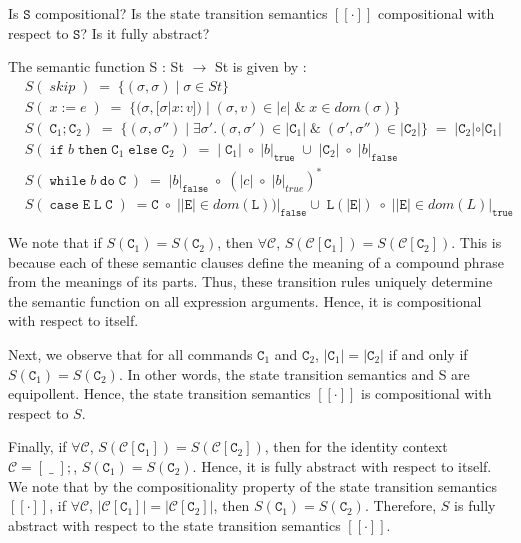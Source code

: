 \documentclass{article}
\newcommand{\E}{\mathtt{E}}
\newcommand{\C}{\mathtt{C}}
\newcommand{\LL}{\mathtt{L}}
\newcommand{\true}{\mathtt{true}}
\newcommand{\false}{\mathtt{false}}
\newcommand{\ifsym}{\mathtt{if}}
\newcommand{\then}{\mathtt{then}}
\newcommand{\elsesym}{\mathtt{else}}
\newcommand{\whilesym}{\mathtt{while}}
\newcommand{\dosym}{\mathtt{do}}
\newcommand{\case}{\mathtt{case}}
\newcommand{\Sem}{\mathtt{S}}
\begin{document}
\begin{enumerate}
{Is $\Sem$ compositional? 
Is the state transition semantics $[[\cdot]]$ compositional with respect to $\Sem$? 
Is it fully abstract?
}

The semantic function S : St $\rightarrow$ St is given by :
\begin{align*}
& S( \; skip \; ) \; = \; \{ (\sigma, \sigma) \; | \; \sigma \in St \} \\
& S( \; x := e \; ) \; = \; \{ (\sigma, [\sigma | x : v]) \; | \; (\sigma, v)
\in | e | \; \& \; x \in dom(\sigma) \} \\
& S( \; \C_1 ; \C_2 ) \;  = \; \{ (\sigma, \sigma'') \; | \; \exists
\sigma'.(\sigma, \sigma') \in | \C_1 | \; \&  \; (\sigma',\sigma'') \in | \C_2 | \} 
\; = \; | \C_2 | \circ | \C_1 | \\
& S( \; \ifsym \; b \; \then  \; \C_1 \; \elsesym \; \C_2 \; ) \; = \; | \;
\C_1 | \; \circ  \; | b |_{\true} \; \cup \; |\C_2| \; \circ \; | b |_{\false} \\
& S( \; \whilesym \; b \; \dosym \; \C \; ) \; = \; | b |_{\false} \; \circ \;
(|c| \; \circ \; | b |_{true} )^{*} \\
& S( \; \case \; \E \; \LL \; \C \; ) \; = \C \; \circ \; | |\E| \in
dom(\LL) ) |_{\false} \cup \; \LL(|\E|) \; \circ \; | |\E| \in dom(L) |_{\true} 
\end{align*}

We note that if $S( \C_1 ) = S( \C_2 )$, then $\forall \mathcal{C}$, $S(
\mathcal{C}[\C_1] ) = S( \mathcal{C}[\C_2] )$. This is because 
each of these semantic clauses define the meaning of a compound phrase 
from the meanings of its parts. Thus, these transition rules uniquely determine
the semantic function on all expression arguments. Hence, it is
compositional with respect to itself.

Next, we observe that for all commands $\C_1$ and $\C_2$, $| \C_1 | = | \C_2 |$
if and only if $S( \C_1 ) = S( \C_2 )$. In other words, the state transition semantics
and S are equipollent. Hence, the state transition semantics $[[\cdot]]$
is compositional with respect to $S$.

Finally, if $\forall \mathcal{C}$, $S(\mathcal{C}[\C_1] ) = S( \mathcal{C}[\C_2]
)$, then for the identity context $\mathcal{C} = [\;\_\;]; $, 
$ S(\C_1) = S(\C_2)$. Hence, it is fully abstract with respect to itself.
We note that by the compositionality property of the state transition semantics
$[[\cdot]]$, if $\forall \mathcal{C}$, $| \mathcal{C}[\C_1] | = |
\mathcal{C}[\C_2] |$, then $S(\C_1) = S(\C_2) $.
Therefore, $S$ is fully abstract with respect to the state transition semantics
$[[\cdot]]$.

\end{enumerate}
\end{document}
